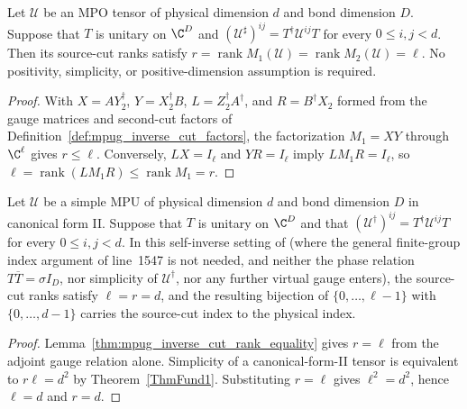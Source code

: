 \begin{lemma}
    \label{thm:mpug_inverse_cut_rank_equality}
    \leanok
    Let $\mathcal U$ be an MPO tensor of physical dimension $d$ and bond
    dimension $D$. Suppose that $T$ is unitary on $\C^D$ and
    $(\mathcal U^\sharp)^{ij}=T^\dagger\mathcal U^{ij}T$ for every
    $0\leq i,j<d$.
    Then its source-cut ranks satisfy
    $r=\operatorname{rank}M_1(\mathcal U)
        =\operatorname{rank}M_2(\mathcal U)=\ell$.
    No positivity, simplicity, or positive-dimension assumption is required.
\end{lemma}
\begin{proof}\leanok
    With $X=AY_2^\dagger$, $Y=X_2^\dagger B$, $L=Z_2^\dagger A^\dagger$, and
    $R=B^\dagger X_2$ formed from the gauge matrices and second-cut factors of
    Definition~\ref{def:mpug_inverse_cut_factors}, the factorization $M_1=XY$
    through $\C^\ell$ gives $r\leq\ell$. Conversely, $LX=I_\ell$ and
    $YR=I_\ell$ imply $LM_1R=I_\ell$, so
    $\ell=\operatorname{rank}(LM_1R)
        \leq\operatorname{rank}M_1=r$.
\end{proof}

\begin{lemma}
    \label{thm:mpug_inverse_source_ranks_physical}
    \leanok
    Let $\mathcal U$ be a simple MPU of physical dimension $d$ and bond
    dimension $D$ in canonical form II. Suppose that $T$ is unitary on
    $\C^D$ and that $(\mathcal U^\dagger)^{ij}=T^\dagger\mathcal U^{ij}T$
    for every $0\leq i,j<d$. In this self-inverse setting of
    \cite[lines~1552--1563]{FrancoRubio2025MPUGauging} (where the general
    finite-group index argument of line~1547 is not needed, and neither the
    phase relation $T\overline T=\sigma I_D$, nor simplicity of
    $\mathcal U^\dagger$, nor any further virtual gauge enters), the source-cut
    ranks satisfy $\ell=r=d$, and the resulting bijection of
    $\{0,\ldots,\ell-1\}$ with $\{0,\ldots,d-1\}$ carries the source-cut index
    to the physical index.
\end{lemma}
\begin{proof}\leanok
    Lemma~\ref{thm:mpug_inverse_cut_rank_equality} gives $r=\ell$ from
    the adjoint gauge relation alone. Simplicity of a canonical-form-II
    tensor is equivalent to $r\ell=d^2$ by Theorem~\ref{ThmFund1}.
    Substituting $r=\ell$ gives $\ell^2=d^2$, hence $\ell=d$ and $r=d$.
\end{proof}


